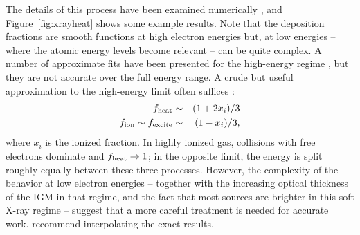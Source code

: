 The details of this process have been examined numerically \cite{shull85,valdes08,furl10-xray}, and Figure~\ref{fig:xrayheat} shows some example results. Note that the deposition fractions are smooth functions at high electron energies but, at low energies -- where the atomic energy levels become relevant -- can be quite complex. A number of approximate fits have been presented for the high-energy regime \cite{ricotti02, volonteri09}, but they are not accurate over the full energy range. A crude but useful approximation to the high-energy limit often suffices \cite{chen04-decay}:
\begin{eqnarray}
f_{\rm heat} & \sim & (1+2 x_i)/3 \nonumber \\
f_{\rm ion} \sim f_{\rm excite} & \sim & (1-x_i)/3,
\label{eq:fxapprox}
\end{eqnarray}
where $x_i$ is the ionized fraction. In highly ionized gas, collisions with free electrons dominate and $f_{\rm heat} \rightarrow 1$; in the opposite limit, the energy is split roughly equally between these three processes. However, the complexity of the behavior at low electron energies -- together with the increasing optical thickness of the IGM in that regime, and the fact that most sources are brighter in this soft X-ray regime -- suggest that a more careful treatment is needed for accurate work. \cite{furl10-xray} recommend interpolating the exact results.




